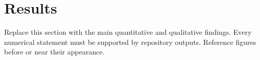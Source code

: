 \section{Results}
\label{sec:results}

Replace this section with the main quantitative and qualitative findings. Every numerical statement must be supported by repository outputs. Reference figures before or near their appearance.

